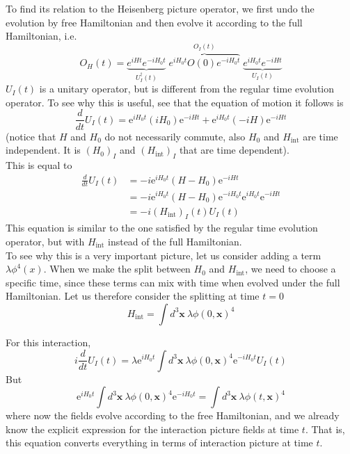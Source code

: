 \documentclass[11pt]{article}
\newcommand{\e}{\mathrm{e}}
\numberwithin{equation}{section}
\begin{document}
    To find its relation to the Heisenberg picture operator, we first undo the evolution by free Hamiltonian and then evolve it according to the full Hamiltonian, i.e.
    \begin{equation*}
        O_H(t) =
        \underbrace{e^{i H t} e^{-i H_0 t} }_{U_I^\dagger(t)}
        \;
        \overbrace{e^{i H_0 t}O(0)e^{-i H_0 t}}^{O_I(t)}
        \;
        \underbrace{ e^{i H_0 t} e^{-i H t}}_{U_I(t)}
    \end{equation*}
    \(U_I(t)\) is a unitary operator, but is different from the regular time evolution operator. To see why this is useful, see that the equation of motion it follows is
    \begin{equation*}
        \frac{d}{dt}U_I(t) = \e^{iH_0t}(iH_0)\e^{-iHt} + \e^{iH_0t} (-iH) \e^{-iHt}
    \end{equation*}
    (notice that \(H\) and \(H_0\) do not necessarily commute, also \(H_0\) and \(H_{\text{int}}\) are time independent. It is \((H_0)_I\) and \((H_{\text{int}})_I\) that are time dependent).\\
    This is equal to 
    \begin{align*}
        \frac{d}{dt}U_I(t)&= -i\e^{iH_0t} (H- H_0) \e^{-iHt}\\
        &=-i\e^{iH_0t} (H- H_0) \e^{-iH_0t} \e^{iH_0t}\e^{-iHt}\\
        &=-i(H_{\text{int}})_I(t) U_I(t)
    \end{align*}
    This equation is similar to the one satisfied by the regular time evolution operator, but with \(H_{\text{int}}\) instead of the full Hamiltonian. \\

    To see why this is a very important picture, let us consider adding a term \(\lambda\phi^4(x)\). When we make the split between \(H_0\) and \(H_{\text{int}}\), we need to choose a specific time, since these terms can mix with time when evolved under the full Hamiltonian. Let us therefore consider the splitting at time \(t=0\)
    \begin{equation*}
        H_{\text{int}} = \int d^3\textbf{x} ~\lambda \phi(0, \textbf{x})^4
    \end{equation*}

    For this interaction, 
    \begin{equation*}
        i\frac{d}{dt}U_I(t) = \lambda \e^{iH_0t}  \int d^3\textbf{x} ~\lambda \phi(0, \textbf{x})^4 \e^{-iH_0t} U_I(t)
    \end{equation*}
    But 
    \begin{equation*}
        \e^{iH_0t}  \int d^3\textbf{x} ~\lambda \phi(0, \textbf{x})^4 \e^{-iH_0t} = \int d^3\textbf{x}~\lambda \phi(t, \textbf{x})^4
    \end{equation*}
    where now the fields evolve according to the free Hamiltonian, and we already know the explicit expression for the interaction picture fields at time \(t\). That is, this equation converts everything in terms of interaction picture at time \(t\).\\
\end{document}
